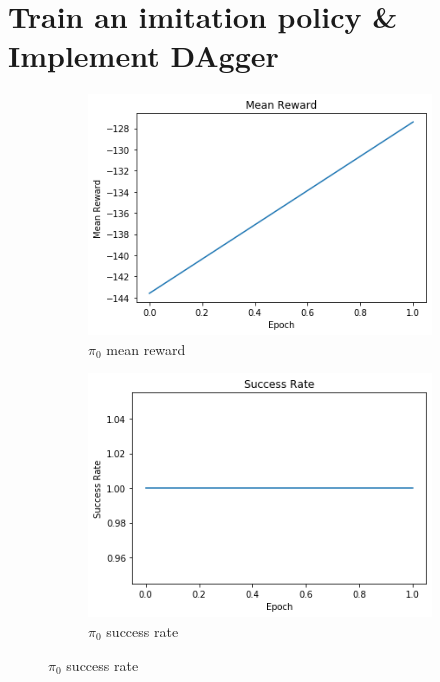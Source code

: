 \documentclass{article}
\begin{document}
    \section{Train an imitation policy \& Implement DAgger} 
    \begin{figure}[h!]
     	\centering
     	\begin{subfigure}[b]{0.3\textwidth}
         	\centering
         	\includegraphics[width=\textwidth]
         	{images/mean_reward_0}
         	\caption{$\pi_0$ mean reward}
         	\label{fig:pi_0_reward}
     	\end{subfigure}
     	\hfill
     	\begin{subfigure}[b]{0.3\textwidth}
         	\centering
         	\includegraphics[width=\textwidth]
         	{images/success_rate_0}
         	\caption{$\pi_0$ success rate}

\end{subfigure}
\end{figure}
\end{document}
